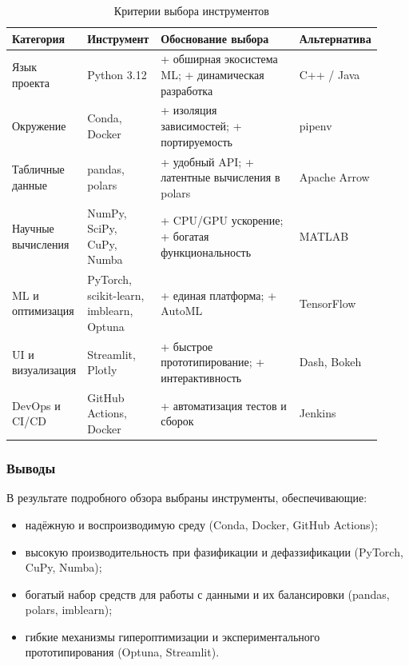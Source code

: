 \begin{table}[h]
\centering\small
\caption{Критерии выбора инструментов}
\label{tab:tool_choice}
\begin{tabular}{@{}p{0.16\linewidth}p{0.20\linewidth}p{0.44\linewidth}p{0.12\linewidth}@{}}
\toprule
\textbf{Категория} & \textbf{Инструмент} & \textbf{Обоснование выбора} & \textbf{Альтернатива} \\ \midrule
Язык проекта       & Python 3.12 & + обширная экосистема ML; + динамическая разработка  & C++ / Java \\[2pt]
Окружение          & Conda, Docker & + изоляция зависимостей; + портируемость & pipenv \\[2pt]
Табличные данные   & pandas, polars & + удобный API; + латентные вычисления в polars & Apache Arrow \\[2pt]
Научные вычисления & NumPy, SciPy, CuPy, Numba & + CPU/GPU ускорение; + богатая функциональность & MATLAB \\[2pt]
ML и оптимизация   & PyTorch, scikit-learn, imblearn, Optuna & + единая платформа; + AutoML & TensorFlow \\[2pt]
UI и визуализация  & Streamlit, Plotly & + быстрое прототипирование; + интерактивность & Dash, Bokeh \\[2pt]
DevOps и CI/CD     & GitHub Actions, Docker & + автоматизация тестов и сборок & Jenkins \\ 
\bottomrule
\end{tabular}
\end{table}

\subsubsection{Выводы}
\label{subsubsec:tool_summary}

В результате подробного обзора выбраны инструменты,
обеспечивающие:
\begin{itemize}
  \item надёжную и воспроизводимую среду (Conda, Docker, GitHub Actions);
  \item высокую производительность при фазификации и дефаззификации
        (PyTorch, CuPy, Numba);
  \item богатый набор средств для работы с данными и их балансировки
        (pandas, polars, imblearn);
  \item гибкие механизмы гипероптимизации и экспериментального
        прототипирования (Optuna, Streamlit).
\end{itemize}


